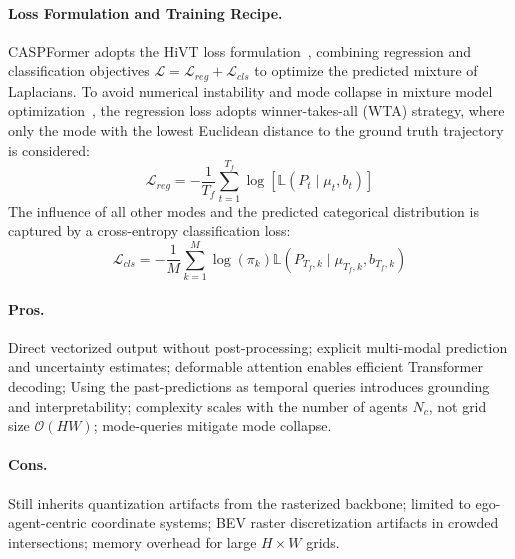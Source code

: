 \begin{description}[leftmargin=1em,itemsep=2pt]
\paragraph{Loss Formulation and Training Recipe.} CASPFormer adopts the HiVT loss formulation~\cite{zhou2022hivt}, combining regression and classification objectives \(\mathcal{L} = \mathcal{L}_{reg} + \mathcal{L}_{cls}\) to optimize the predicted mixture of Laplacians.
To avoid numerical instability and mode collapse in mixture model optimization~\cite{rupprecht2017learning}, the regression loss adopts winner-takes-all (WTA) strategy, where only the mode with the lowest Euclidean distance to the ground truth trajectory is considered:
\begin{equation}
  \label{eq:caspformer_regression_loss}
  \mathcal{L}_{reg} = -\frac{1}{T_f} \sum_{t=1}^{T_f} \log[\mathbb{L}(P_t \mid \mu_t, b_t)]
\end{equation}
The influence of all other modes and the predicted categorical distribution is captured by a cross-entropy classification loss:
\begin{equation}
  \label{eq:caspformer_classification_loss}
  \mathcal{L}_{cls} = -\frac{1}{M} \sum_{k=1}^{M} \log(\pi_k) \mathbb{L}(P_{T_f, k} \mid \mu_{T_f, k}, b_{T_f, k})
\end{equation}
\end{description}

\paragraph{Pros.} Direct vectorized output without post-processing; explicit multi-modal prediction and uncertainty estimates; deformable attention enables efficient Transformer decoding; Using the past-predictions as temporal queries introduces grounding and interpretability; complexity scales with the number of agents \( N_c \), not grid size \(\mathcal{O}(HW)\); mode-queries mitigate mode collapse.

\paragraph{Cons.} Still inherits quantization artifacts from the rasterized backbone; limited to ego-agent-centric coordinate systems; BEV raster discretization artifacts in crowded intersections; memory overhead for large \(H \times W\) grids.


